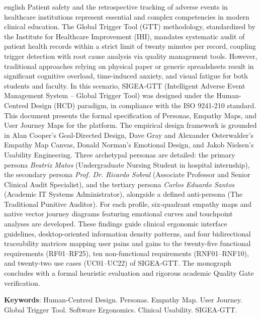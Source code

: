 \begin{resumo}[Abstract]
\begin{otherlanguage*}{english}
Patient safety and the retrospective tracking of adverse events in healthcare institutions represent essential and complex competencies in modern clinical education. The Global Trigger Tool (GTT) methodology, standardized by the Institute for Healthcare Improvement (IHI), mandates systematic audit of patient health records within a strict limit of twenty minutes per record, coupling trigger detection with root cause analysis via quality management tools. However, traditional approaches relying on physical paper or generic spreadsheets result in significant cognitive overload, time-induced anxiety, and visual fatigue for both students and faculty. In this scenario, SIGEA-GTT (Intelligent Adverse Event Management System -- Global Trigger Tool) was designed under the Human-Centred Design (HCD) paradigm, in compliance with the ISO 9241-210 standard. This document presents the formal specification of Personas, Empathy Maps, and User Journey Maps for the platform. The empirical design framework is grounded in Alan Cooper's Goal-Directed Design, Dave Gray and Alexander Osterwalder's Empathy Map Canvas, Donald Norman's Emotional Design, and Jakob Nielsen's Usability Engineering. Three archetypal personas are detailed: the primary persona \textit{Beatriz Matos} (Undergraduate Nursing Student in hospital internship), the secondary persona \textit{Prof. Dr. Ricardo Sobral} (Associate Professor and Senior Clinical Audit Specialist), and the tertiary persona \textit{Carlos Eduardo Santos} (Academic IT Systems Administrator), alongside a defined anti-persona (The Traditional Punitive Auditor). For each profile, six-quadrant empathy maps and native vector journey diagrams featuring emotional curves and touchpoint analyses are developed. These findings guide clinical ergonomic interface guidelines, desktop-oriented information density patterns, and four bidirectional traceability matrices mapping user pains and gains to the twenty-five functional requirements (RF01--RF25), ten non-functional requirements (RNF01--RNF10), and twenty-two use cases (UC01--UC22) of SIGEA-GTT. The monograph concludes with a formal heuristic evaluation and rigorous academic Quality Gate verification.

\textbf{Keywords}: Human-Centred Design. Personas. Empathy Map. User Journey. Global Trigger Tool. Software Ergonomics. Clinical Usability. SIGEA-GTT.
\end{otherlanguage*}
\end{resumo}
